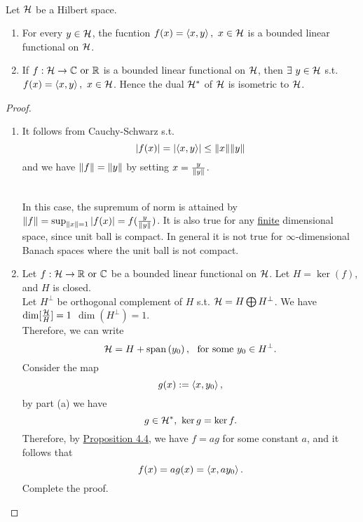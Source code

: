 \begin{theorem}\label{RRT}\ \\
Let $\mathcal{H}$ be a Hilbert space.
\begin{enumerate}[label = (\alph*)]
    \item For every $y \in \mathcal{H}$, the fucntion $f(x) = \left\langle x, y \right\rangle,\ x \in \mathcal{H}$ is a bounded linear functional on $\mathcal{H}$.
    \item If $f: \mathcal{H} \to \mathbb{C} \text{ or } \mathbb{R}$ is a bounded linear functional on $\mathcal{H}$, then $\exists\ y \in \mathcal{H}$ s.t. $f(x) = \left\langle x, y \right\rangle,\ x\in \mathcal{H}$. Hence the dual $\mathcal{H}^*$ of $\mathcal{H}$ is isometric to $\mathcal{H}$.
\end{enumerate}
\end{theorem}
\begin{proof}\
\begin{enumerate}[label = (\alph*)]
    \item It follows from Cauchy-Schwarz s.t.
    \begin{equation*}
        \abs{f(x)} = \abs{\left\langle x, y \right\rangle} \leq \norm{x} \norm{y} 
    \end{equation*}
    and we have $\norm{f} = \norm{y}$ by setting $x = \frac{y}{\norm{y}}$. 
    \begin{remark}\ \\
    In this case, the supremum of norm is attained by $\norm{f} = \sup_{\norm{x} = 1} \abs{f(x)} = f(\frac{y}{\norm{y}})$. It is also true for any \underline{finite} dimensional space, since unit ball is compact. In general it is not true for $\infty$-dimensional Banach spaces where the unit ball is not compact.
    \end{remark}
    \item Let $f: \mathcal{H} \to \mathbb{R} \text{ or } \mathbb{C}$ be a bounded linear functional on $\mathcal{H}$. Let $H = \ker(f)$, and $H$ is closed.\\ Let $H^\perp$ be orthogonal complement of $H$ s.t. $\mathcal{H} = H \bigoplus H^\perp$. We have $\dim[\frac{\mathcal{H}}{H}] = 1$ \imply $\dim(H^\perp) = 1$.\\
    Therefore, we can write
    \begin{equation*}
        \mathcal{H} = H + \operatorname{span}\left(y_0\right),\ \text{ for some } y_0 \in H^\perp.
    \end{equation*}
    Consider the map
    \begin{equation*}
        g(x) := \left\langle x, y_0 \right\rangle,
    \end{equation*}
    by part (a) we have
    \begin{equation*}
        g \in \mathcal{H}^*,\ \ker{g} = \ker{f}.
    \end{equation*}
    Therefore, by \hyperref[4.4]{Proposition 4.4}, we have $f = ag$ for some constant $a$, and it follows that
    \begin{equation*}
        f(x) = ag(x) = \left\langle x, a y_0 \right\rangle.
    \end{equation*}
    Complete the proof.
\end{enumerate}
\end{proof}

